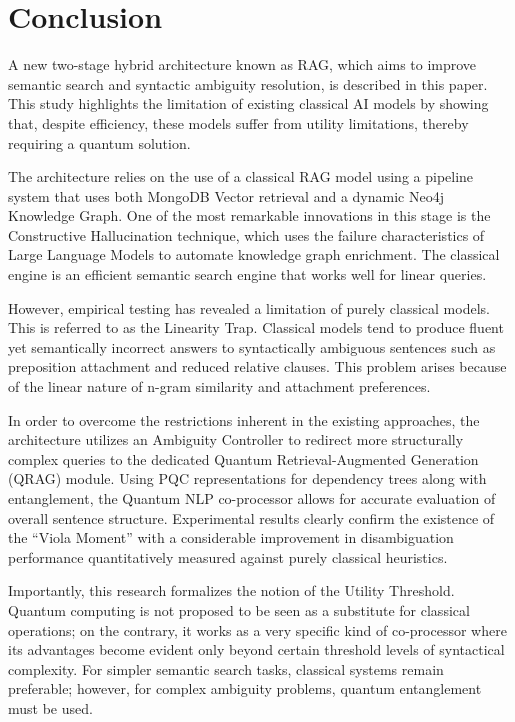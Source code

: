 \chapter*{Conclusion}

A new two-stage hybrid architecture known as RAG, which aims to improve semantic search and syntactic ambiguity resolution, is described in this paper. This study highlights the limitation of existing classical AI models by showing that, despite efficiency, these models suffer from utility limitations, thereby requiring a quantum solution.

The architecture relies on the use of a classical RAG model using a pipeline system that uses both MongoDB Vector retrieval and a dynamic Neo4j Knowledge Graph. One of the most remarkable innovations in this stage is the Constructive Hallucination technique, which uses the failure characteristics of Large Language Models to automate knowledge graph enrichment. The classical engine is an efficient semantic search engine that works well for linear queries.

However, empirical testing has revealed a limitation of purely classical models. This is referred to as the Linearity Trap. Classical models tend to produce fluent yet semantically incorrect answers to syntactically ambiguous sentences such as preposition attachment and reduced relative clauses. This problem arises because of the linear nature of n-gram similarity and attachment preferences.

In order to overcome the restrictions inherent in the existing approaches, the architecture utilizes an Ambiguity Controller to redirect more structurally complex queries to the dedicated Quantum Retrieval-Augmented Generation (QRAG) module. Using PQC representations for dependency trees along with entanglement, the Quantum NLP co-processor allows for accurate evaluation of overall sentence structure. Experimental results clearly confirm the existence of the “Viola Moment” with a considerable improvement in disambiguation performance quantitatively measured against purely classical heuristics.

Importantly, this research formalizes the notion of the Utility Threshold. Quantum computing is not proposed to be seen as a substitute for classical operations; on the contrary, it works as a very specific kind of co-processor where its advantages become evident only beyond certain threshold levels of syntactical complexity. For simpler semantic search tasks, classical systems remain preferable; however, for complex ambiguity problems, quantum entanglement must be used.

